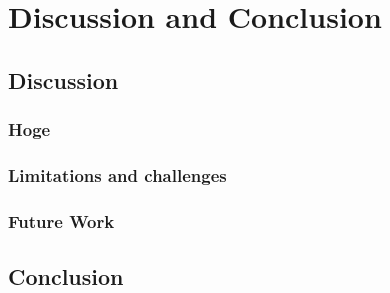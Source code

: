 \chapter{Discussion and Conclusion}
\section{Discussion}
\subsection{Hoge}

\subsection{Limitations and challenges}

\subsection{Future Work}

\section{Conclusion}
